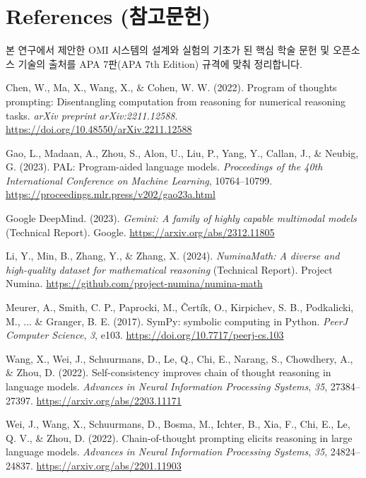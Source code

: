 \section{References (참고문헌)}

본 연구에서 제안한 OMI 시스템의 설계와 실험의 기초가 된 핵심 학술 문헌 및 오픈소스 기술의 출처를 APA 7판(APA 7th Edition) 규격에 맞춰 정리합니다.

\begingroup
\setlength{\parindent}{-1.5em}
\setlength{\leftskip}{1.5em}
\setlength{\parskip}{0.6em}

Chen, W., Ma, X., Wang, X., \& Cohen, W. W. (2022). Program of thoughts prompting: Disentangling computation from reasoning for numerical reasoning tasks. \textit{arXiv preprint arXiv:2211.12588}. \url{https://doi.org/10.48550/arXiv.2211.12588} \par

Gao, L., Madaan, A., Zhou, S., Alon, U., Liu, P., Yang, Y., Callan, J., \& Neubig, G. (2023). PAL: Program-aided language models. \textit{Proceedings of the 40th International Conference on Machine Learning}, 10764–10799. \url{https://proceedings.mlr.press/v202/gao23a.html} \par

Google DeepMind. (2023). \textit{Gemini: A family of highly capable multimodal models} (Technical Report). Google. \url{https://arxiv.org/abs/2312.11805} \par

Li, Y., Min, B., Zhang, Y., \& Zhang, X. (2024). \textit{NuminaMath: A diverse and high-quality dataset for mathematical reasoning} (Technical Report). Project Numina. \url{https://github.com/project-numina/numina-math} \par

Meurer, A., Smith, C. P., Paprocki, M., Čertík, O., Kirpichev, S. B., Podkalicki, M., ... \& Granger, B. E. (2017). SymPy: symbolic computing in Python. \textit{PeerJ Computer Science}, \textit{3}, e103. \url{https://doi.org/10.7717/peerj-cs.103} \par

Wang, X., Wei, J., Schuurmans, D., Le, Q., Chi, E., Narang, S., Chowdhery, A., \& Zhou, D. (2022). Self-consistency improves chain of thought reasoning in language models. \textit{Advances in Neural Information Processing Systems}, \textit{35}, 27384–27397. \url{https://arxiv.org/abs/2203.11171} \par

Wei, J., Wang, X., Schuurmans, D., Bosma, M., Ichter, B., Xia, F., Chi, E., Le, Q. V., \& Zhou, D. (2022). Chain-of-thought prompting elicits reasoning in large language models. \textit{Advances in Neural Information Processing Systems}, \textit{35}, 24824–24837. \url{https://arxiv.org/abs/2201.11903} \par

